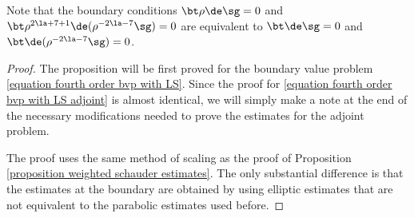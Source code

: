 \documentclass[hidelinks, 12pt, oneside, reqno]{amsart}
\begin{document}
\begin{rmk}
    Note that the boundary conditions $\bt \rho \de \sg = 0$ and $\bt \rho^{2\la + 7 + 1} \de (\rho^{-2\la -7} \sg) = 0$ are equivalent to $\bt \de \sg = 0$ and $\bt \de (\rho^{-2\la -7} \sg) = 0$.
\end{rmk}

\begin{proof}
    The proposition will be first proved for the boundary value problem \eqref{equation fourth order bvp with LS}. Since the proof for \eqref{equation fourth order bvp with LS adjoint} is almost identical, we will simply make a note at the end of the necessary modifications needed to prove the estimates for the adjoint problem. 
    
    The proof uses the same method of scaling as the proof of Proposition \ref{proposition weighted schauder estimates}. The only substantial difference is that the estimates at the boundary are obtained by using elliptic estimates that are not equivalent to the parabolic estimates used before. 


\end{proof}
\end{document}
